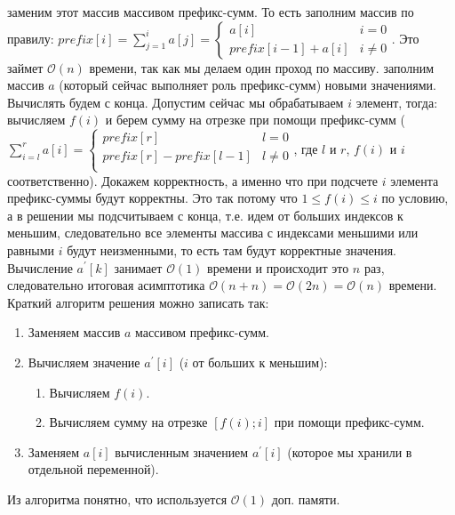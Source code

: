 \documentclass[a4paper,12pt]{article}
\begin{document}
 заменим этот массив массивом префикс-сумм. То есть заполним массив по правилу: $prefix[i] = \sum\limits_{j=1}^i a[j] = \begin{cases} a[i] & i = 0\\prefix[i - 1] + a[i] & i \neq 0\end{cases}$. Это займет $\mathcal{O}(n)$ времени, так как мы делаем один проход по массиву.
 заполним массив $a$ (который сейчас выполняет роль префикс-сумм) новыми значениями. 
Вычислять будем с конца. Допустим сейчас мы обрабатываем $i$ элемент, тогда: вычисляем $f(i)$ и берем сумму на отрезке при помощи префикс-сумм ($\sum\limits_{i=l}^r a[i]= \begin{cases}prefix[r] & l=0\\ prefix[r] - prefix[l - 1] & l \neq 0\\  \end{cases}$, где $l$ и $r$, $f(i)$ и $i$ соответственно). 
Докажем корректность, а именно что при подсчете $i$ элемента префикс-суммы будут корректны. Это так потому что $1 \leq f(i) \leq i$ по условию, а в решении мы подсчитываем с конца, т.е. идем от больших индексов к меньшим, следовательно все элементы массива с индексами меньшими или равными $i$ будут неизменными, то есть там будут корректные значения. Вычисление $a^\prime[k]$ занимает $\mathcal{O}(1)$ времени и происходит это $n$ раз, следовательно итоговая асимптотика $\mathcal{O}(n + n) = \mathcal{O}(2n) = \mathcal{O}(n)$ времени.\\Краткий алгоритм решения можно записать так:\begin{enumerate}
\item Заменяем массив $a$ массивом префикс-сумм.
\item Вычисляем значение $a^\prime[i]$ ($i$ от больших к меньшим):
\begin{enumerate}
\item Вычисляем $f(i)$.
\item Вычисляем сумму на отрезке $[f(i); i]$ при помощи префикс-сумм. 
\end{enumerate}
\item Заменяем $a[i]$ вычисленным значением $a^\prime[i]$ (которое мы хранили в отдельной переменной).
\end{enumerate}
Из алгоритма понятно, что используется $\mathcal{O}(1)$ доп. памяти.
\end{document}
